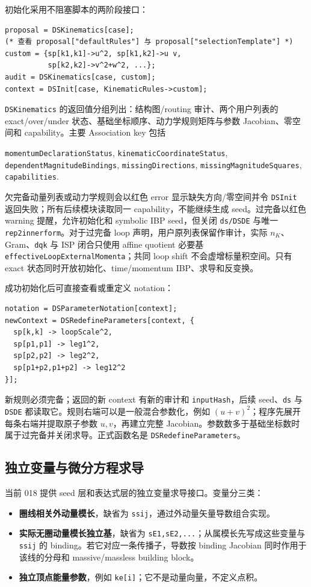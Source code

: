 ﻿\documentclass[a4paper,11pt]{article}
\begin{document}
初始化采用不阻塞脚本的两阶段接口：
\begin{verbatim}
proposal = DSKinematics[case];
(* 查看 proposal["defaultRules"] 与 proposal["selectionTemplate"] *)
custom = {sp[k1,k1]->u^2, sp[k1,k2]->u v,
          sp[k2,k2]->v^2+w^2, ...};
audit = DSKinematics[case, custom];
context = DSInit[case, KinematicRules->custom];
\end{verbatim}
\texttt{DSKinematics} 的返回值分组列出：结构图/routing 审计、两个用户列表的 exact/over/under 状态、基础坐标顺序、动力学规则矩阵与参数 Jacobian、零空间和 capability。主要 Association key 包括
\begin{center}
\texttt{momentumDeclaration\allowbreak Status},
\texttt{kinematicCoordinate\allowbreak Status},
\texttt{dependentMagnitudeBindings},
\texttt{missingDirections},
\texttt{missingMagnitudeSquares},
\texttt{capabilities}.
\end{center}
欠完备动量列表或动力学规则会以红色 error 显示缺失方向/零空间并令 \texttt{DSInit} 返回失败；所有后续模块读取同一 capability，不能继续生成 seed。过完备以红色 warning 提醒，允许初始化和 symbolic IBP seed，但关闭 \texttt{ds/DSDE} 与唯一 \texttt{rep2innerform}。对于过完备 loop 声明，用户原列表保留作审计，实际 $n_K$、Gram、\texttt{dqk} 与 ISP 闭合只使用 affine quotient 必要基 \texttt{effectiveLoopExternalMomenta}；共同 loop shift 不会虚增标量积空间。只有 exact 状态同时开放初始化、time/momentum IBP、求导和反变换。

成功初始化后可直接查看或重定义 notation：
\begin{verbatim}
notation = DSParameterNotation[context];
newContext = DSRedefineParameters[context, {
  sp[k,k] -> loopScale^2,
  sp[p1,p1] -> leg1^2,
  sp[p2,p2] -> leg2^2,
  sp[p1+p2,p1+p2] -> leg12^2
}];
\end{verbatim}
新规则必须完备；返回的新 context 有新的审计和 \texttt{inputHash}，后续 seed、\texttt{ds} 与 \texttt{DSDE} 都读取它。规则右端可以是一般混合参数化，例如 $(u+v)^2$；程序先展开每条右端并提取原子参数 $u,v$，再建立完整 Jacobian。参数数多于基础坐标数时属于过完备并关闭求导。正式函数名是 \texttt{DSRedefineParameters}。

\subsection{独立变量与微分方程求导}

当前 018 提供 seed 层和表达式层的独立变量求导接口。变量分三类：
\begin{itemize}
  \item \textbf{圈线相关外动量模长}，缺省为 \texttt{ssij}，通过外动量矢量导数组合实现。
  \item \textbf{实际无圈动量模长独立基}，缺省为 \texttt{sE1,sE2,...}；从属模长先写成这些变量与 \texttt{ssij} 的 binding。若它对应一条传播子，导数按 binding Jacobian 同时作用于该线的分母和 massive/massless building block。
  \item \textbf{独立顶点能量参数}，例如 \texttt{ke[i]}；它不是动量向量，不定义点积。
\end{itemize}
\end{document}
